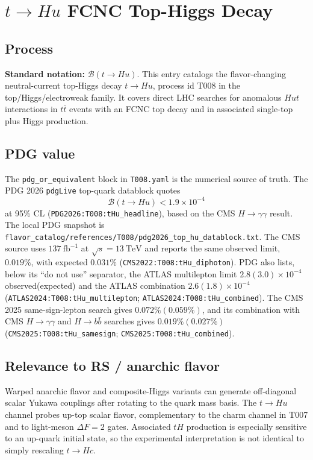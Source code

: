 
\section{\texorpdfstring{\(t\to H u\)}{t -> H u} FCNC Top-Higgs Decay}

\subsection*{Process}
\textbf{Standard notation:} \(\mathcal{B}(t\to H u)\).
This entry catalogs the flavor-changing neutral-current top-Higgs decay
\(t\to H u\), process id T008 in the top/Higgs/electroweak family.  It covers
direct LHC searches for anomalous \(Hut\) interactions in \(t\bar t\) events
with an FCNC top decay and in associated single-top plus Higgs production.

\subsection*{PDG value}
The \texttt{pdg\_or\_equivalent} block in \texttt{T008.yaml} is the numerical
source of truth.  The PDG 2026 \texttt{pdgLive} top-quark datablock quotes
\[
  \mathcal{B}(t\to H u) < 1.9\times 10^{-4}
\]
at 95\% CL (\texttt{PDG2026:T008:tHu\_headline}), based on the CMS
\(H\to\gamma\gamma\) result.  The local PDG snapshot is
\texttt{flavor\_catalog/references/T008/pdg2026\_top\_hu\_datablock.txt}.
The CMS source uses \(137~\mathrm{fb}^{-1}\) at \(\sqrt{s}=13~\mathrm{TeV}\)
and reports the same observed limit, \(0.019\%\), with expected \(0.031\%\)
(\texttt{CMS2022:T008:tHu\_diphoton}).  PDG also lists, below its
``do not use'' separator, the ATLAS multilepton limit
\(2.8(3.0)\times10^{-4}\) observed(expected) and the ATLAS combination
\(2.6(1.8)\times10^{-4}\)
(\texttt{ATLAS2024:T008:tHu\_multilepton};
\texttt{ATLAS2024:T008:tHu\_combined}).  The CMS 2025 same-sign-lepton search
gives \(0.072\%(0.059\%)\), and its combination with CMS
\(H\to\gamma\gamma\) and \(H\to b\bar b\) searches gives
\(0.019\%(0.027\%)\)
(\texttt{CMS2025:T008:tHu\_samesign};
\texttt{CMS2025:T008:tHu\_combined}).

\subsection*{Relevance to RS / anarchic flavor}
Warped anarchic flavor and composite-Higgs variants can generate off-diagonal
scalar Yukawa couplings after rotating to the quark mass basis.  The \(t\to H u\)
channel probes up-top scalar flavor, complementary to the
charm channel in T007 and to light-meson \(\Delta F=2\) gates.  Associated
\(tH\) production is especially sensitive to an up-quark initial state, so the
experimental interpretation is not identical to simply rescaling \(t\to Hc\).

